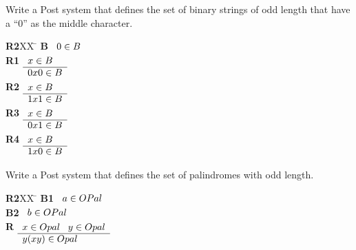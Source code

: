 \documentclass[]{exam}
\begin{document}
\begin{questions}
\question Write a Post system that defines the set of binary strings of odd
length that have a ``0'' as the middle character.
\begin{solution}
\begin{tabbing}
{\bf R2}XX \=  \kill
{\bf B} \>
        \(\begin{array}[t]{l}
        0\in B
        \end{array}\) \\[2ex]
{\bf R1} \>
        \(\begin{array}[t]{l}
        x \in B \\
        \hline
        0x0 \in B
        \end{array}\) \\[2ex]
{\bf R2} \>
        \(\begin{array}[t]{l}
        x \in B \\
        \hline
        1x1 \in B
        \end{array}\) \\[2ex]
{\bf R3} \>
        \(\begin{array}[t]{l}
        x \in B \\
        \hline
        0x1 \in B
        \end{array}\) \\[2ex]
{\bf R4} \>
        \(\begin{array}[t]{l}
        x \in B \\
        \hline
        1x0 \in B
        \end{array}\)
\end{tabbing}

\end{solution}


\question Write a Post system that defines the set of palindromes with odd
length.
\begin{solution}
\begin{tabbing}
{\bf R2}XX \=  \kill
{\bf B1} \>
        \(\begin{array}[t]{l}
        a \in OPal
        \end{array}\) \\[2ex]
{\bf B2} \>
        \(\begin{array}[t]{l}
        b \in OPal 
        \end{array}\) \\[2ex]
{\bf R} \>
        \(\begin{array}[t]{l}
        x \in Opal \;\;\;y \in Opal \\
        \hline
        y(xy) \in Opal
        \end{array}\)
\end{tabbing}
\end{solution}


\end{questions}
\end{document}
